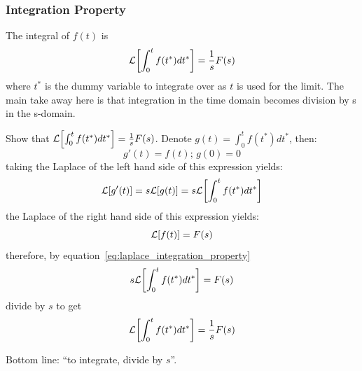 \documentclass[12pt,letter]{article}
\begin{document}
\subsubsection{Integration Property}

The integral of $f(t)$ is
\begin{equation}
\mathcal{L}{\left[\int_{0}^{t}f(t^*)dt^*\right]} = \frac{1}{s}F(s)
\end{equation}
where $t^*$ is the dummy variable to integrate over as $t$ is used for the limit.  The main take away here is that integration in the time domain becomes division by s in the s-domain.

\begin{mdframed}[middlelinewidth=0.5mm]
\begin{center}
\end{center}

\noindent Show that $\mathcal{L}{\left[\int_{0}^{t}f(t^*)dt^*\right]} = \frac{1}{s}F(s)$. Denote $g(t) =  \int_{0}^{t}f(t^*)dt^*$, then:
\begin{equation}
g'(t) = f(t)\text{; } g(0) = 0
\label{eq:laplace_integration_property}
\end{equation}
taking the Laplace of the left hand side of this expression yields:
\begin{equation}
\mathcal{L}{\left[g'(t)\right]} = s\mathcal{L}{\left[g(t)\right]} = s \mathcal{L}{\left[\int_{0}^{t}f(t^*)dt^*\right]}
\end{equation}
the Laplace of the right hand side of this expression yields:
\begin{equation}
\mathcal{L}{\left[f(t)\right]} = F(s)
\end{equation}
therefore, by equation~\ref{eq:laplace_integration_property} 
\begin{equation}
s \mathcal{L}{\left[\int_{0}^{t}f(t^*)dt^*\right]} = F(s)
\end{equation}
divide by $s$ to get 
\begin{equation}
\mathcal{L}{\left[\int_{0}^{t}f(t^*)dt^*\right]} = \frac{1}{s}F(s)
\end{equation}

Bottom line: ``to integrate, divide by $s$''. 
\end{mdframed}
\end{document}
